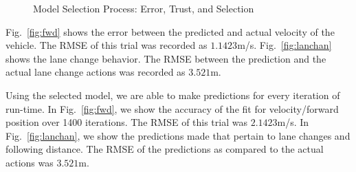 \documentclass[letterpaper, 10 pt, conference]{ieeeconf}  %
\begin{document}
\begin{figure}[h]
	\centering
	\vspace{-5pt}
	\caption{Model Selection Process: Error, Trust, and Selection}
	\label{fig:fitprocess}
	\vspace{-5pt}
\end{figure}

Fig.~\ref{fig:fwd} shows the error between the predicted and actual velocity of the vehicle. The RMSE of this trial was recorded as $1.1423$m/s.
Fig.~\ref{fig:lanchan} shows the lane change behavior. The RMSE between the prediction and the actual lane change actions was recorded as $3.521$m.

Using the selected model, we are able to make predictions for every iteration of run-time. In Fig.~\ref{fig:fwd}, we show the accuracy of the fit for velocity/forward position over 1400 iterations. The RMSE of this trial was $2.1423$m/s. 
In Fig.~\ref{fig:lanchan}, we show the predictions made that pertain to lane changes and following distance. The RMSE of the predictions as compared to the actual actions was $3.521$m. 
\end{document}
